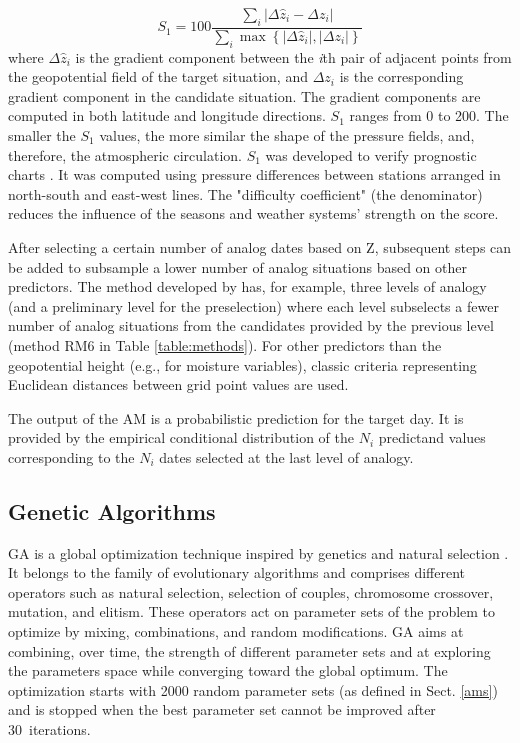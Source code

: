 \documentclass[draft]{agujournal2019}
\begin{document}
\begin{equation}
	\label{eq:S1}
	S_{1}=100 \frac {
        \displaystyle \sum_{i} 
            \vert \Delta\hat{z}_{i} - 
            \Delta z_{i} \vert
    }
	{
        \displaystyle \sum_{i} \max\left\lbrace 
            \vert \Delta\hat{z}_{i} \vert , 
            \vert \Delta z_{i} \vert \right
        \rbrace 
    }
\end{equation}
where $\Delta \hat{z}_{i}$ is the gradient component between the \textit{i}th pair of adjacent points from the geopotential field of the target situation, and $\Delta z_{i}$ is the corresponding gradient component in the candidate situation. The gradient components are computed in both latitude and longitude directions. $S_{1}$ ranges from 0 to 200. The smaller the $S_{1}$ values, the more similar the shape of the pressure fields, and, therefore, the atmospheric circulation. $S_{1}$ was developed to verify prognostic charts \cite{Teweles1954}. It was computed using pressure differences between stations arranged in north-south and east-west lines. The "difficulty coefficient" (the denominator) reduces the influence of the seasons and weather systems' strength on the score.

After selecting a certain number of analog dates based on Z, subsequent steps can be added to subsample a lower number of analog situations based on other predictors. The method developed by  has, for example, three levels of analogy (and a preliminary level for the preselection) where each level subselects a fewer number of analog situations from the candidates provided by the previous level (method RM6 in Table \ref{table:methods}). For other predictors than the geopotential height (e.g., for moisture variables), classic criteria representing Euclidean distances between grid point values are used.

The output of the AM is a probabilistic prediction for the target day. It is provided by the empirical conditional distribution of the $N_{i}$ predictand values corresponding to the $N_{i}$ dates selected at the last level of analogy.


\subsection{Genetic Algorithms}
\label{gas}

GA is a global optimization technique inspired by genetics and natural selection \cite{Holland1992b}. It belongs to the family of evolutionary algorithms and comprises different operators such as natural selection, selection of couples, chromosome crossover, mutation, and elitism. These operators act on parameter sets of the problem to optimize by mixing, combinations, and random modifications. GA aims at combining, over time, the strength of different parameter sets and at exploring the parameters space while converging toward the global optimum. The optimization starts with 2000 random parameter sets (as defined in Sect. \ref{ams}) and is stopped when the best parameter set cannot be improved after 30~iterations.
\end{document}
